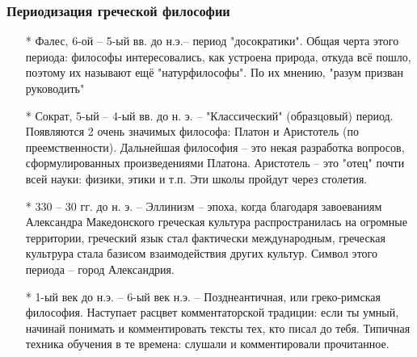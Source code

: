 \documentclass[a4paper, 12pt]{book} %
\begin{document}
\subsubsection*{Периодизация греческой философии}
\begin{itemize}
\item[*] Фалес, 6-ой -- 5-ый вв. до н.э.-- период "досократики". Общая черта этого периода: философы интересовались, как устроена природа, откуда всё пошло, поэтому их называют ещё "натурфилософы". По их мнению, "разум призван руководить"

\item[*] Сократ, 5-ый -- 4-ый вв. до н. э.  -- "Классический" (образцовый) период. Появляются 2 очень значимых философа: Платон и Аристотель (по преемственности). Дальнейшая философия -- это некая разработка вопросов, сформулированных произведениями Платона. Аристотель -- это "отец" почти всей науки: физики, этики и т.п. Эти школы пройдут через столетия.

\item[*] 330 -- 30 гг. до н. э. -- Эллинизм -- эпоха, когда благодаря завоеваниям Александра Македонского греческая культура распространилась на огромные территории, греческий язык стал фактически международным, греческая культрура стала базисом взаимодействия других культур. Символ этого периода -- город Александрия.

\item[*] 1-ый век до н.э. -- 6-ый век н.э. -- Позднеантичная, или греко-римская философия. Наступает расцвет комментаторской традиции: если ты умный, начинай понимать и комментировать тексты тех, кто писал до тебя. Типичная техника обучения в те времена: слушали и комментировали прочитанное. 
\end{itemize}

 
\end{document}
